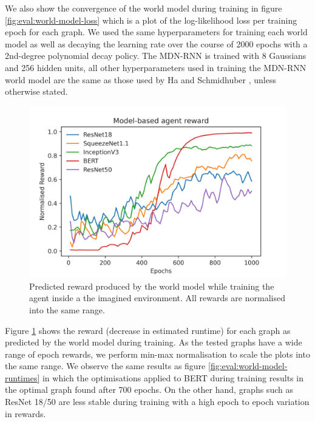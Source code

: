 We also show the convergence of the world model during training in figure \ref{fig:eval:world-model-loss} which is a plot of the log-likelihood loss per training epoch for each graph. We used the same hyperparameters for training each world model as well as decaying the learning rate over the course of 2000 epochs with a 2nd-degree polynomial decay policy. The MDN-RNN is trained with 8 Gaussians and 256 hidden units, all other hyperparameters used in training the MDN-RNN world model are the same as those used by Ha and Schmidhuber \cite{ha2018worldmodels}, unless otherwise stated.

\begin{figure}[h]
  \centering
  \includegraphics[width=1\columnwidth]{sections/5evaluation/images/mb_ctrl_training_reward.png}
  \caption[Predicted epoch reward during training of agent in world model]{Predicted reward produced by the world model while training the agent inside a the imagined environment. All rewards are normalised into the same range.}
  \label{fig:eval:world-model-pred-reward}
\end{figure}

Figure \ref{fig:eval:world-model-pred-reward} shows the reward (decrease in estimated runtime) for each graph as predicted by the world model during training. As the tested graphs have a wide range of epoch rewards, we perform min-max normalisation to scale the plots into the same range. We observe the same results as figure \ref{fig:eval:world-model-runtimes} in which the optimisations applied to BERT during training results in the optimal graph found after 700 epochs. On the other hand, graphs such as ResNet 18/50 are less stable during training with a high epoch to epoch variation in rewards.

